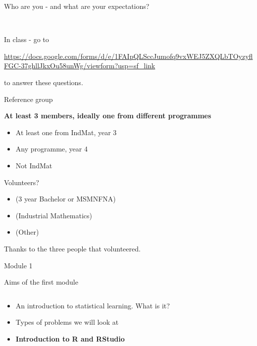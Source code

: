 \documentclass[10pt,ignorenonframetext,]{beamer}
\providecommand{\tightlist}{%
  \setlength{\itemsep}{0pt}\setlength{\parskip}{0pt}}
\begin{document}
\begin{frame}{Who are you - and what are your expectations?}
\protect\hypertarget{who-are-you---and-what-are-your-expectations}{}

~

In class - go to

\url{https://docs.google.com/forms/d/e/1FAIpQLSccJumofq9vxWEJ5ZXQLbTOyzyflFGC-37ghllJkxOu58unWg/viewform?usp=sf_link}

to answer these questions.

\end{frame}

\begin{frame}{Reference group}
\protect\hypertarget{reference-group}{}

\textbf{At least 3 members, ideally one from different programmes}

\begin{itemize}
\tightlist
\item
  At least one from IndMat, year 3
\item
  Any programme, year 4
\item
  Not IndMat
\end{itemize}

Volunteers?

\begin{itemize}
\tightlist
\item
  (3 year Bachelor or MSMNFNA)
\item
  (Industrial Mathematics)
\item
  (Other)
\end{itemize}

Thanks to the three people that volunteered.

\end{frame}

\begin{frame}{Module 1}
\protect\hypertarget{module-1}{}

\begin{block}{Aims of the first module}

\(~\)

\begin{itemize}
\tightlist
\item
  An introduction to statistical learning. What is it?
\end{itemize}

\vspace{2mm}

\begin{itemize}
\tightlist
\item
  Types of problems we will look at
\end{itemize}

\vspace{2mm}

\begin{itemize}
\tightlist
\item
  \textbf{Introduction to R and RStudio }
\end{itemize}

\end{block}

\end{frame}
\end{document}
